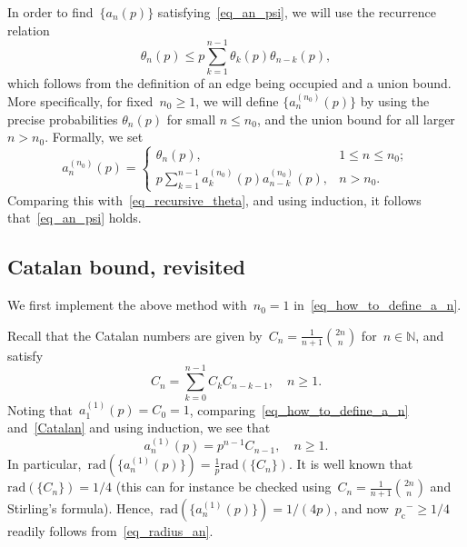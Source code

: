 \documentclass[pdflatex,sn-mathphys-num]{sn-jnl}%
\newcommand{\1}{{\ensuremath{\mathbf{1}}} }
\newcommand{\pc}{\ensuremath{p_{\mathrm{c}} }}
\theoremstyle{thmstyleone}%
\theoremstyle{thmstyletwo}%
\theoremstyle{thmstylethree}%
\begin{document}
In order to find~$\{a_n(p)\}$ satisfying~\eqref{eq_an_psi}, we will use the recurrence relation
\begin{equation}
	\label{eq_recursive_theta}
	\theta_n(p) \le p \sum_{k=1}^{n-1} \theta_k(p) \theta_{n-k}(p),
\end{equation}
which follows from the definition of an edge being occupied and a union bound. 
More specifically, for
fixed~$n_0 \ge 1$, 
we will define 
$\{a_n^{(n_0)}(p)\}$ by using
the precise probabilities 
$\theta_n(p)$ for small 
$n\le n_0$, and the 
union bound for all larger $n>n_0$. 
Formally, we set
\begin{equation}
	\label{eq_how_to_define_a_n}
	a_n^{(n_0)}(p) = \begin{cases}\theta_n(p),&1\le n \le n_0;\\[.2cm] p\sum_{k=1}^{n-1} a_k^{(n_0)}(p) a^{(n_0)}_{n-k}(p),&n > n_0.\end{cases}
\end{equation}
Comparing this with~\eqref{eq_recursive_theta}, and using induction, it follows  that~\eqref{eq_an_psi} holds.










\subsection{Catalan bound, revisited}
\label{S_Catalan}
We first implement the above method with~$n_0 = 1$ in~\eqref{eq_how_to_define_a_n}. 

Recall that the Catalan numbers are given by~$C_n = \frac{1}{n+1} \binom{2n}{n}$ for~$n \in \mathbb N$, and satisfy
\begin{equation}\label{Catalan}
C_n = \sum_{k=0}^{n-1} C_k C_{n-k-1}, \quad n \ge 1.
\end{equation}
Noting that~$a^{(1)}_1(p) = C_0 = 1$, comparing~\eqref{eq_how_to_define_a_n} and~\eqref{Catalan} and using induction, we see that
\begin{equation*}
	a^{(1)}_n(p) = p^{n-1}  C_{n-1}, \quad n \ge 1.
\end{equation*}
In particular,~$\mathrm{rad}(\{a^{(1)}_n(p)\}) = \tfrac{1}{p}\mathrm{rad}(\{C_n\})$. It is well known that~$\mathrm{rad}(\{C_n\}) = 1/4$ (this can for instance be checked using~$C_n = \frac{1}{n+1} \binom{2n}{n}$ and Stirling's formula). Hence,~$\mathrm{rad}(\{a^{(1)}_n(p)\}) = 1/(4p)$, and now~$\pc^- \ge 1/4$ readily follows from~\eqref{eq_radius_an}.
\end{document}

